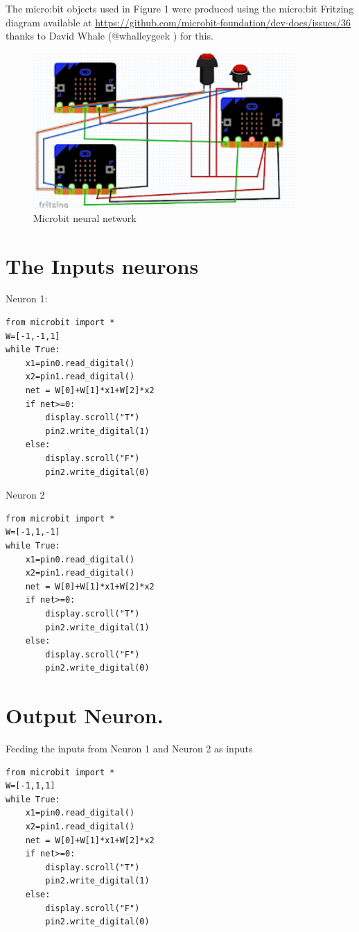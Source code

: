 The micro:bit objects used in Figure 1 were produced using the micro:bit Fritzing diagram available at 
\url{https://github.com/microbit-foundation/dev-docs/issues/36} thanks to David Whale (@whalleygeek ) for this.

\begin{figure}
    \centering
    \includegraphics[width=10cm]{chapters/chAi1/figures/Screen Shot 2018-04-03 at 14.08.07.png}
    \caption{Microbit neural network}
    \label{fig:MicroibitANN1}
\end{figure}

\section{The Inputs neurons}

Neuron 1:

\begin{verbatim}
from microbit import *
W=[-1,-1,1]
while True:
    x1=pin0.read_digital()
    x2=pin1.read_digital()
    net = W[0]+W[1]*x1+W[2]*x2
    if net>=0:
        display.scroll("T")
        pin2.write_digital(1)
    else:
        display.scroll("F")
        pin2.write_digital(0)
\end{verbatim}


Neuron 2
\begin{verbatim}
from microbit import *
W=[-1,1,-1]
while True:
    x1=pin0.read_digital()
    x2=pin1.read_digital()
    net = W[0]+W[1]*x1+W[2]*x2
    if net>=0:
        display.scroll("T")
        pin2.write_digital(1)
    else:
        display.scroll("F")
        pin2.write_digital(0)   
\end{verbatim}




\section{Output Neuron.}
Feeding the inputs from Neuron 1 and Neuron 2 as inputs

\begin{verbatim}
from microbit import *
W=[-1,1,1]
while True:
    x1=pin0.read_digital()
    x2=pin1.read_digital()
    net = W[0]+W[1]*x1+W[2]*x2
    if net>=0:
        display.scroll("T")
        pin2.write_digital(1)
    else:
        display.scroll("F")
        pin2.write_digital(0)  
\end{verbatim}






